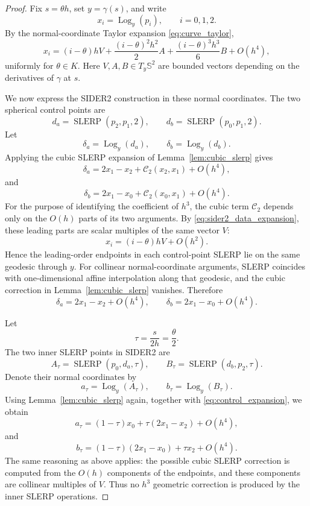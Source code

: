 \documentclass[10pt,a4paper]{amsart}
\newcommand{\Log}{\operatorname{Log}}
\newcommand{\SLERP}{\operatorname{SLERP}}
\newcommand{\bS}{\mathbb{S}}
\begin{document}
\begin{proof}
Fix \(s=\theta h\), set \(y=\gamma(s)\), and write
\[
        x_i=\Log_y(p_i),\qquad i=0,1,2.
\]
By the normal-coordinate Taylor expansion \eqref{eq:curve_taylor},
\begin{equation}
\label{eq:sider2_data_expansion}
x_i
=
(i-\theta)hV
+
\frac{(i-\theta)^2h^2}{2}A
+
\frac{(i-\theta)^3h^3}{6}B
+
O(h^4),
\end{equation}
uniformly for \(\theta\in K\).  Here \(V,A,B\in T_y\bS^2\) are bounded
vectors depending on the derivatives of \(\gamma\) at \(s\).

We now express the SIDER2 construction in these normal coordinates.  The two
spherical control points are
\[
        d_a=\SLERP(p_2,p_1,2),
        \qquad
        d_b=\SLERP(p_0,p_1,2).
\]
Let
\[
        \delta_a=\Log_y(d_a),\qquad
        \delta_b=\Log_y(d_b).
\]
Applying the cubic SLERP expansion of Lemma~\ref{lem:cubic_slerp} gives
\[
        \delta_a=2x_1-x_2+\mathcal C_2(x_2,x_1)+O(h^4),
\]
and
\[
        \delta_b=2x_1-x_0+\mathcal C_2(x_0,x_1)+O(h^4).
\]
For the purpose of identifying the coefficient of \(h^3\), the cubic term
\(\mathcal C_2\) depends only on the \(O(h)\) parts of its two arguments.  By
\eqref{eq:sider2_data_expansion}, these leading parts are scalar multiples of
the same vector \(V\):
\[
        x_i=(i-\theta)hV+O(h^2).
\]
Hence the leading-order endpoints in each control-point SLERP lie on the same
geodesic through \(y\).  For collinear normal-coordinate arguments, SLERP
coincides with one-dimensional affine interpolation along that geodesic, and
the cubic correction in Lemma~\ref{lem:cubic_slerp} vanishes.  Therefore
\begin{equation}
\label{eq:control_expansion}
        \delta_a=2x_1-x_2+O(h^4),
        \qquad
        \delta_b=2x_1-x_0+O(h^4).
\end{equation}

Let
\[
        \tau=\frac{s}{2h}=\frac{\theta}{2}.
\]
The two inner SLERP points in SIDER2 are
\[
        A_\tau=\SLERP(p_0,d_a,\tau),
        \qquad
        B_\tau=\SLERP(d_b,p_2,\tau).
\]
Denote their normal coordinates by
\[
        a_\tau=\Log_y(A_\tau),\qquad
        b_\tau=\Log_y(B_\tau).
\]
Using Lemma~\ref{lem:cubic_slerp} again, together with
\eqref{eq:control_expansion}, we obtain
\[
        a_\tau
        =
        (1-\tau)x_0+\tau(2x_1-x_2)+O(h^4),
\]
and
\[
        b_\tau
        =
        (1-\tau)(2x_1-x_0)+\tau x_2+O(h^4).
\]
The same reasoning as above applies: the possible cubic SLERP correction is
computed from the \(O(h)\) components of the endpoints, and these components
are collinear multiples of \(V\).  Thus no \(h^3\) geometric correction is
produced by the inner SLERP operations.


\end{proof}
\end{document}
